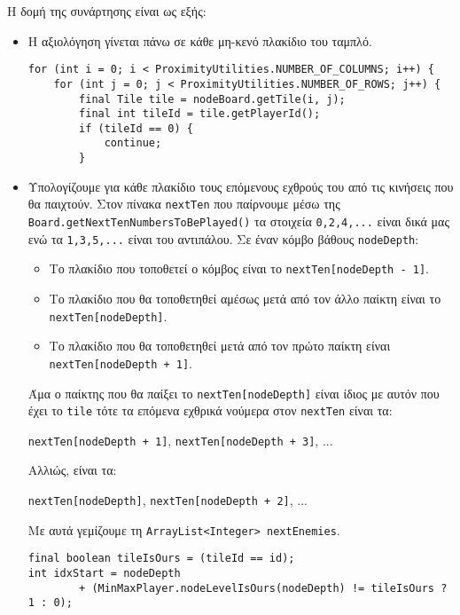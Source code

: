 Η δομή της συνάρτησης είναι ως εξής:
\begin{itemize}
\item Η αξιολόγηση γίνεται πάνω σε κάθε μη-κενό πλακίδιο του ταμπλό.
\begin{lstlisting}[style=chunk]
for (int i = 0; i < ProximityUtilities.NUMBER_OF_COLUMNS; i++) {
    for (int j = 0; j < ProximityUtilities.NUMBER_OF_ROWS; j++) {
        final Tile tile = nodeBoard.getTile(i, j);
        final int tileId = tile.getPlayerId();
        if (tileId == 0) {
            continue;
        }
\end{lstlisting}

\item \label{item:nextEnemies} \sloppy
Υπολογίζουμε για κάθε πλακίδιο τους επόμενους εχθρούς του από τις κινήσεις που θα παιχτούν.
Στον πίνακα \lstinline!nextTen! που παίρνουμε μέσω της \lstinline!Board.getNextTenNumbersToBePlayed()!
τα στοιχεία \lstinline!0,2,4,...! είναι δικά μας ενώ τα \lstinline!1,3,5,...! είναι του αντιπάλου.
Σε έναν κόμβο βάθους \lstinline!nodeDepth!:
\begin{itemize}
\item Το πλακίδιο που τοποθετεί ο κόμβος είναι το
\lstinline!nextTen[nodeDepth - 1]!.

\item Το πλακίδιο που θα τοποθετηθεί αμέσως μετά από τον άλλο παίκτη είναι το
\lstinline!nextTen[nodeDepth]!.

\item Το πλακίδιο που θα τοποθετηθεί μετά από τον πρώτο παίκτη είναι
\lstinline!nextTen[nodeDepth + 1]!.
\end{itemize}

Άμα ο παίκτης που θα παίξει το \lstinline!nextTen[nodeDepth]! είναι ίδιος με αυτόν που έχει το \lstinline!tile! τότε
τα επόμενα εχθρικά νούμερα στον \lstinline!nextTen! είναι τα:
\begin{center}
\lstinline!nextTen[nodeDepth + 1]!, \lstinline!nextTen[nodeDepth + 3]!, ...
\end{center}
Αλλιώς, είναι τα:
\begin{center}
\lstinline!nextTen[nodeDepth]!, \lstinline!nextTen[nodeDepth + 2]!, ...
\end{center}
Με αυτά γεμίζουμε τη \lstinline!ArrayList<Integer> nextEnemies!.
\begin{lstlisting}[style=chunk]
final boolean tileIsOurs = (tileId == id);
int idxStart = nodeDepth
        + (MinMaxPlayer.nodeLevelIsOurs(nodeDepth) != tileIsOurs ? 1 : 0);


\end{lstlisting}
\end{itemize}
